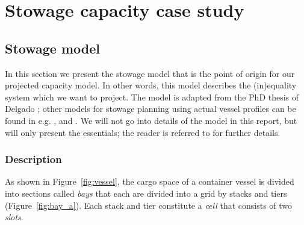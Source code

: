 \section{Stowage capacity case study}\label{sec:results}
\subsection{Stowage model}
In this section we present the stowage model that is the point of origin for our projected capacity model. In other words, this model describes the (in)equality system which we want to project. The model is adapted from the PhD thesis of Delgado \cite{AlbertosThesis}; other models for stowage planning using actual vessel profiles can be found in e.g. \cite{DariosThesis}, \cite{pacino11} and \cite{pacino12}. We will not go into details of the model in this report, but will only present the essentials; the reader is referred to \cite{AlbertosThesis}  
for further details. 
%
\subsubsection*{Description}
As shown in Figure~\ref{fig:vessel}, the cargo space of a container vessel is divided into
sections called \textit{bays} that each are divided into a grid by stacks and tiers (Figure~\ref{fig:bay_a}). Each stack and tier constitute a \emph{cell} that consists of two \emph{slots}. 

